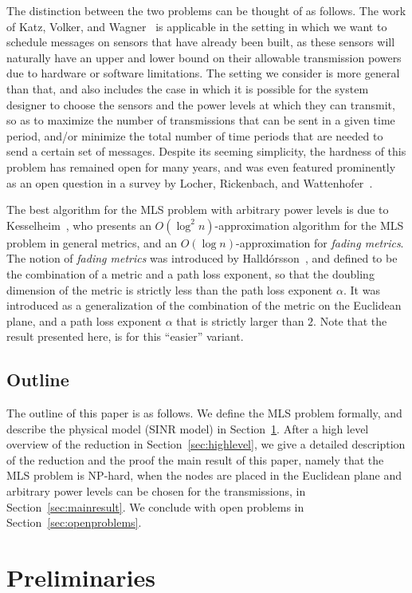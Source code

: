 \documentclass{article}
\begin{document}
The distinction between the two problems can be thought of as follows. The work of Katz, Volker, and Wagner~\cite{KVW10}
is applicable in the setting in which we want to schedule messages on sensors that have already been built, as these sensors will naturally have an upper and lower bound on their allowable transmission powers due to hardware or software limitations.
The setting we consider is more general than that, and also includes the case in which
it is possible for the system designer to choose the sensors and the power levels at which they can transmit, so as to maximize the number of transmissions that can be sent in a given time period, and/or minimize the total number of time periods that are needed to send a certain set of messages.  Despite its seeming simplicity, the hardness of this problem has remained open for many years, and was even featured prominently as an open question in a survey by Locher, Rickenbach, and Wattenhofer~\cite{LRW08}.


The best algorithm for the MLS problem with arbitrary power levels is due to Kesselheim~\cite{K11}, who presents an $O( \log^2 n )$-approximation algorithm for the MLS problem in general metrics, and an $O( \log n )$-approximation for {\em fading metrics}. The notion of {\em fading metrics} was introduced by Halld\'orsson~\cite{H09}, and defined to be the combination of a metric and a path loss exponent, so that the doubling dimension of the metric is strictly less than the path loss exponent $\alpha$. It was introduced as a generalization of the combination of the metric on the Euclidean plane, and a path loss exponent $\alpha$ that is strictly larger than $2$. Note that the result presented here, is for this ``easier'' variant.


\subsection{Outline}
The outline of this paper is as follows. We define the MLS problem formally, and describe the physical model (SINR model) in Section~\ref{sec:pre}. After a high level overview of the reduction in Section~\ref{sec:highlevel}, we give a detailed description of the reduction and the proof the main result of this paper, namely that the MLS problem is NP-hard, when the nodes are placed in the Euclidean plane and arbitrary power levels can be chosen for the transmissions, in Section~\ref{sec:mainresult}. We conclude with open problems in Section~\ref{sec:openproblems}.


\section{Preliminaries}
\label{sec:pre}
\end{document}

